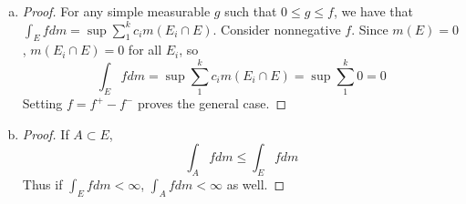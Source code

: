 \documentclass[11pt]{article}
\begin{document}
\begin{exercise}{2}
\begin{enumerate} [(a)]
\begin{proof}
        \end{proof}
        \item \begin{proof}
            For any simple measurable $g$ such that $0 \le g \le f$, we have that $\int_E f dm = \sup \sum_1^k c_i m(E_i \cap E)$. Consider nonnegative $f$. Since $m(E) = 0$, $m(E_i \cap E) = 0$ for all $E_i$, so $$\int_E f dm = \sup \sum_1^k c_i m(E_i \cap E) = \sup \sum_1^k 0 = 0 $$ Setting $f = f^+ - f^-$ proves the general case.
        \end{proof}
        \item \begin{proof}
            If $A \subset E$, $$\int_A f dm \le \int_E f dm$$ Thus if $\int_E f dm < \infty$, $\int_A f dm < \infty$ as well.
        \end{proof}
    \end{enumerate}
\end{exercise}
\end{document}
